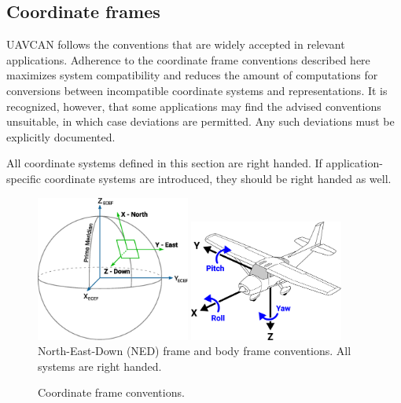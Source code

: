 \subsection{Coordinate frames}

UAVCAN follows the conventions that are widely accepted in relevant applications.
Adherence to the coordinate frame conventions described here maximizes system compatibility and
reduces the amount of computations for conversions between incompatible coordinate systems and
representations.
It is recognized, however, that some applications may find the advised conventions unsuitable,
in which case deviations are permitted.
Any such deviations must be explicitly documented.

All coordinate systems defined in this section are right handed.
If application-specific coordinate systems are introduced, they should be right handed as well.

\begin{figure}[hbt]
    \centering
	\includegraphics[width=0.45\textwidth]{application_layer/NED_ECEF}
    \includegraphics[width=0.45\textwidth]{application_layer/aircraft_principal_axes}
    North-East-Down (NED) frame and body frame conventions. All systems are right handed.
    \caption{
        Coordinate frame conventions.
        \label{fig:application_coordinate_frame_conventions}
    }
\end{figure}

